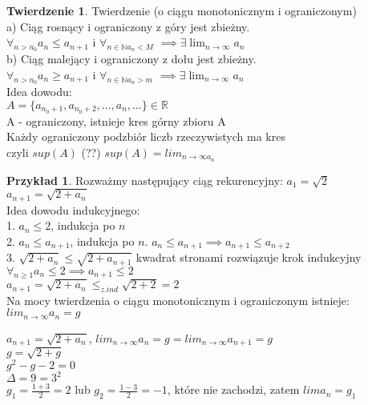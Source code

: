 \documentclass{article}
\theoremstyle{definition}
\theoremstyle{definition}
\newtheorem{tw}{Twierdzenie}[subsection]
\theoremstyle{definition}
\newtheorem{pk}{Przykład}[subsection]
\theoremstyle{definition}
\begin{document}
\begin{tw}
Twierdzenie (o ciągu monotonicznym i ograniczonym)\\
a) Ciąg rosnący i ograniczony z góry jest zbieżny.\\
$\forall_{n>n_0} a_n\leq a_{n+1}$ i $\forall_{n\in \mathbb{N} a_n< M}$ $\implies \exists \lim_{n\rightarrow \infty} a_n$\\
b) Ciąg malejący i ograniczony z dołu jest zbieżny.\\
$\forall_{n>n_0} a_n\geq a_{n+1}$ i $\forall_{n\in \mathbb{N} a_n> m}$ $\implies \exists \lim_{n\rightarrow \infty} a_n$\\
Idea dowodu:\\
$A=\{a_{n_0+1},a_{n_0+2},\dots,a_n,\dots\} \in \mathbb{R}$\\
A - ograniczony, istnieje kres górny zbioru A\\
Każdy ograniczony podzbiór liczb rzeczywistych ma kres\\
czyli $sup(A)$ (??) $sup(A)=lim_{n\rightarrow \infty a_n}$
\end{tw}

\begin{pk}
Rozważmy następujący ciąg rekurencyjny:
$a_1=\sqrt{2}$ $a_{n+1}=\sqrt{2+a_n}$\\
Idea dowodu indukcyjnego:\\
1. $a_n\leq 2$, indukcja po $n$\\
2. $a_n\leq a_{n+1}$, indukcja po $n$. $a_n\leq a_{n+1}\implies a_{n+1}\leq a_{n+2}$\\
3. $\sqrt{2+a_n}\leq \sqrt{2+a_{n+1}}$ kwadrat stronami rozwiązuje krok indukcyjny\\

$\forall_{n\geq 1} a_n \leq 2 \implies a_{n+1}\leq 2$\\
$a_{n+1}=\sqrt{2+a_n}\leq_{z. ind} \sqrt{2+2}=2$\\

Na mocy twierdzenia o ciągu monotonicznym i ograniczonym istnieje:\\
$lim_{n\rightarrow \infty} a_n = g$\\

\begin{center}
$a_{n+1}=\sqrt{2+a_n}$, $lim_{n\rightarrow \infty} a_n = g = lim_{n\rightarrow \infty} a_{n+1} = g$\\
$g=\sqrt{2+g}$\\
$g^2-g-2=0$\\
$\Delta=9=3^2$\\
$g_1=\frac{1+3}{2}=2$ lub $g_2=\frac{1-3}{2}=-1$, które nie zachodzi, zatem $lim a_n=g_1$
\end{center}
\end{pk}
\end{document}
